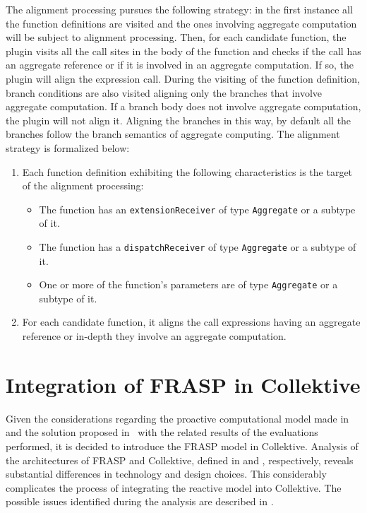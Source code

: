 The alignment processing pursues the following strategy: in the first instance all the function definitions are visited and the ones involving aggregate computation will be subject to alignment processing. Then, for each candidate function, the plugin visits all the call sites in the body of the function and checks if the call has an aggregate reference or if it is involved in an aggregate computation. If so, the plugin will align the expression call. During the visiting of the function definition, branch conditions are also visited aligning only the branches that involve aggregate computation. If a branch body does not involve aggregate computation, the plugin will not align it. Aligning the branches in this way, by default all the branches follow the branch semantics of aggregate computing. The alignment strategy is formalized below:

\begin{enumerate}
    \item Each function definition exhibiting the following characteristics is the target of the alignment processing:
    \begin{itemize}
        \item The function has an \texttt{extensionReceiver} of type \texttt{Aggregate} or a subtype of it.
        \item The function has a \texttt{dispatchReceiver} of type \texttt{Aggregate} or a subtype of it.
        \item One or more of the function's parameters are of type \texttt{Aggregate} or a subtype of it.
    \end{itemize}
    \item For each candidate function, it aligns the call expressions having an aggregate reference or in-depth they involve an aggregate computation.
\end{enumerate}

\section{Integration of FRASP in Collektive}

Given the considerations regarding the proactive computational model made in  and the solution proposed in~\cite{Casadei2023} with the related results of the evaluations performed, it is decided to introduce the FRASP model in Collektive.
Analysis of the architectures of FRASP and Collektive, defined in  and , respectively, reveals substantial differences in technology and design choices. This considerably complicates the process of integrating the reactive model into Collektive. The possible issues identified during the analysis are described in .

